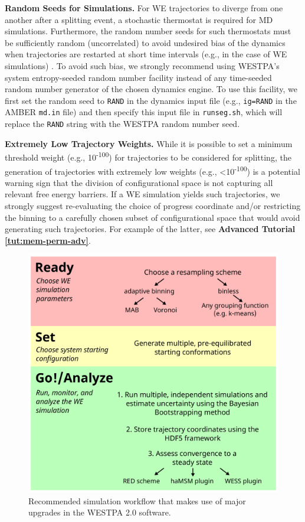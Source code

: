 \textbf{Random Seeds for Simulations.} For WE trajectories to diverge from one another after a splitting event, a stochastic thermostat is required for MD simulations. 
Furthermore, the random number seeds for such thermostats must be sufficiently random (uncorrelated) to avoid undesired bias of the dynamics when trajectories are restarted at short time intervals (e.g., in the case of WE simulations) \citep{cerutti_vulnerability_2008}. 
To avoid such bias, we strongly recommend using WESTPA’s system entropy-seeded random number facility instead of any time-seeded random number generator of the chosen dynamics engine. 
To use this facility, we first set the random seed to \verb|RAND| in the dynamics input file (e.g., \verb|ig=RAND| in the AMBER \verb|md.in| file) and then specify this input file in \verb|runseg.sh|, which will replace the \verb|RAND| string with the WESTPA random number seed. 

\textbf{Extremely Low Trajectory Weights.} While it is possible to set a minimum threshold weight (e.g., 10\textsuperscript{-100}) for trajectories to be considered for splitting, the generation of trajectories with extremely low weights (e.g., <10\textsuperscript{-100}) is a potential warning sign that the division of configurational space is not capturing all relevant free energy barriers. 
If a WE simulation yields such trajectories, we strongly suggest re-evaluating the choice of progress coordinate and/or restricting the binning to a carefully chosen subset of configurational space that would avoid generating such trajectories.
For example of the latter, see \textbf{Advanced Tutorial \ref{tut:mem-perm-adv}}.

\begin{figure}[ht]
\centering
\includegraphics[width=\columnwidth]{figures/Figure2_workflow.pdf}
\caption{Recommended simulation workflow that makes use of major upgrades in the WESTPA 2.0 software.}
\label{fig:workflow}
\end{figure}

